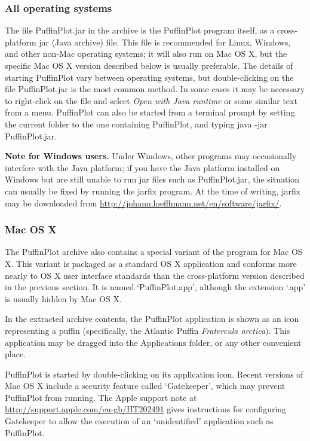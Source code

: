\documentclass[a4paper,british]{article}
\newcommand{\ppcmd}[1]{\textsf{#1}} %
\begin{document}
\subsubsection{All operating systems}

The file \textsf{PuffinPlot.jar} in the archive is the PuffinPlot program
itself, as a cross-platform jar (Java archive) file. This file is recommended
for Linux, Windows, and other non-Mac operating systems; it will also run on
Mac OS X, but the specific Mac OS X version described below is usually
preferable. The details of starting PuffinPlot vary between operating
systems, but double-clicking on the file \textsf{PuffinPlot.jar} is the most
common method. In some cases it may be necessary to right-click on the file
and select \emph{Open with Java runtime} or some similar text from a menu.
PuffinPlot can also be started from a terminal prompt by setting the current
folder to the one containing PuffinPlot, and typing \textsf{java -jar
  PuffinPlot.jar}.

\textbf{Note for Windows users.} Under Windows, other programs may
occasionally interfere with the Java platform; if you have the Java platform
installed on Windows but are still unable to run \ppcmd{jar} files such as
\ppcmd{PuffinPlot.jar}, the situation can usually be fixed by running the
\ppcmd{jarfix} program. At the time of writing, \ppcmd{jarfix} may be
downloaded from \url{http://johann.loefflmann.net/en/software/jarfix/}.

\subsubsection{Mac OS X}

The PuffinPlot archive also contains a special variant of the program for Mac
OS X. This variant is packaged as a standard OS X application and conforms
more nearly to OS X user interface standards than the cross-platform version
described in the previous section. It is named `PuffinPlot.app', although 
the extension `.app' is usually hidden by Mac OS X.

In the extracted archive contents, the PuffinPlot application is shown
as an icon representing a puffin (specifically, the Atlantic Puffin
\emph{Fratercula arctica}). This application may be dragged into the
Applications folder, or any other convenient place.

PuffinPlot is started by double-clicking on its application icon. Recent
versions of Mac OS X include a security feature called `Gatekeeper',
which may prevent PuffinPlot from running. The Apple support note at
\url{http://support.apple.com/en-gb/HT202491} gives instructions for
configuring Gatekeeper to allow the execution of an `unidentified'
application such as PuffinPlot.
\end{document}
